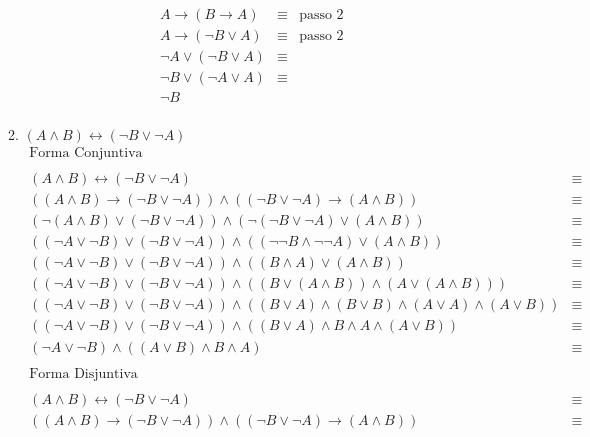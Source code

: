 \begin{enumerate}
\begin{enumerate}
\[\begin{array}{lcl}
							A\rightarrow(B\rightarrow A) & \equiv & \text{passo 2} \\
							A \to (\neg B \lor A) & \equiv & \text{passo 2}\\
							\neg A \lor (\neg B \lor A) & \equiv & \\
							\neg B \lor (\neg A \lor A) & \equiv & \\
							\neg B & & \\
							
						\end{array}
					\]
				\item $(A\land B)\leftrightarrow(\neg B\lor \neg A)$
					\[
						\begin{array}{lcl}
							\text{Forma Conjuntiva} & & \\
							& & \\
							(A\land B)\leftrightarrow(\neg B\lor \neg A) &\equiv & \\
							((A \land B) \to (\neg B \lor \neg A)) \land ((\neg B \lor \neg A) \to (A \land B)) & \equiv& \\
							(\neg (A \land B) \lor (\neg B \lor \neg A)) \land (\neg (\neg B \lor \neg A) \lor (A \land B)) &\equiv & \\
							((\neg A \lor \neg B) \lor (\neg B \lor \neg A)) \land ((\neg \neg B \land \neg \neg A) \lor (A \land B)) & \equiv& \\
							((\neg A \lor \neg B) \lor (\neg B \lor \neg A)) \land ((B \land A) \lor (A \land B)) & \equiv& \\
							((\neg A \lor \neg B) \lor (\neg B \lor \neg A)) \land ((B \lor (A \land B)) \land (A \lor (A \land B))) &\equiv & \\
							((\neg A \lor \neg B) \lor (\neg B \lor \neg A)) \land 
							((B \lor A) \land (B \lor B) \land (A \lor A) \land (A \lor B)) &\equiv & \\
							((\neg A \lor \neg B) \lor (\neg B \lor \neg A)) \land 
							((B \lor A) \land B  \land A \land (A \lor B)) &\equiv & \\
							(\neg A \lor \neg B) \land ((A \lor B) \land B  \land A) & \equiv & \\
							& & \\
							\text{Forma Disjuntiva} & & \\
							& & \\
							(A\land B)\leftrightarrow(\neg B\lor \neg A) &\equiv & \\
							((A \land B) \to (\neg B \lor \neg A)) \land ((\neg B \lor \neg A) \to (A \land B)) & \equiv& \\

\end{array}\]
\end{enumerate}
\end{enumerate}
